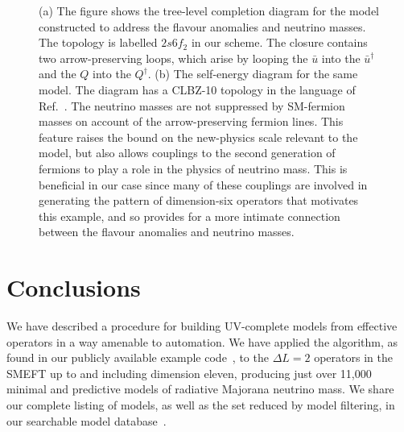 \begin{figure}[t]
  \centering
  \caption[(a) The figure shows the tree-level completion diagram for the model
  constructed to address the flavour anomalies and neutrino masses. (b) The
  self-energy diagram for the same model.]{(a) The figure shows the tree-level
    completion diagram for the model constructed to address the flavour
    anomalies and neutrino masses. The topology is labelled $2s6f_{2}$ in our
    scheme. The closure contains two arrow-preserving loops, which arise by
    looping the $\bar{u}$ into the $\bar{u}^{\dagger}$ and the $Q$ into the
    $Q^{\dagger}$. (b) The self-energy diagram for the same model. The diagram
    has a CLBZ-10 topology in the language of Ref.~\cite{Sierra:2014rxa}. The
    neutrino masses are not suppressed by SM-fermion masses on account of the
    arrow-preserving fermion lines. This feature raises the bound on the
    new-physics scale relevant to the model, but also allows couplings to the
    second generation of fermions to play a role in the physics of neutrino
    mass. This is beneficial in our case since many of these couplings are
    involved in generating the pattern of dimension-six operators that motivates
    this example, and so provides for a more intimate connection between the
    flavour anomalies and neutrino masses.}
  \label{fig:ch2-flavour-anomalies-model-diagrams}
\end{figure}


\section{Conclusions}
\label{sec:ch2-conclusions}

We have described a procedure for building UV-complete models from effective
operators in a way amenable to automation. We have applied the algorithm, as
found in our publicly available example code~\cite{neutrinomass2020}, to the
$\Delta L = 2$ operators in the SMEFT up to and including dimension eleven,
producing just over 11,000 minimal and predictive models of radiative Majorana
neutrino mass. We share our complete listing of models, as well as the set
reduced by model filtering, in our searchable model
database~\cite{gargalionis_john_2020_4054618}.

